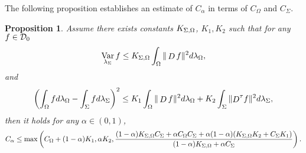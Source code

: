 \documentclass[a4paper]{article}
\newtheorem{proposition}[theorem]{Proposition}
\theoremstyle{definition}
\DeclareMathOperator{\Var}{Var}
\numberwithin{equation}{section}
\begin{document}
The following proposition establishes an estimate of $C_\alpha$ in terms of $C_\Omega$ and $C_\Sigma$. 
\begin{proposition}
\label{prop:interp_method}
Assume  there exists constants $K_{\Sigma,\Omega}$, $K_1, K_2$ such that for any $f \in \mathcal {D}_0$
\begin{align}
\Var_{\lambda_\Sigma} f
\leq  \Cint \int_\Omega \| \Deriv f \|^2 d\lambda_\Omega ,
\label{ineq Cint}
\end{align}
and 
\begin{align}
\left( \int_\Omega f d \lambda_\Omega - \int_\Sigma f d \lambda_\Sigma \right)^2
\leq K_1 \int_\Omega \| \mathop D f \|^2 d\lambda_\Omega + K_2 \int_\Sigma \| {\mathop D}^\tau f \|^2 d\lambda_\Sigma,
\label{ineq K}
\end{align}
then it holds for any  $\alpha \in (0,1)$, 
\begin{align}
C_\alpha \leq
\max \left(
C_\Omega + (1-\alpha)K_1 ,
\alpha K_2 ,
\frac{(1-\alpha)K_{\Sigma,\Omega} C_\Sigma +\alpha C_\Omega C_\Sigma+\alpha(1-\alpha)(K_{\Sigma,\Omega} K_2+C_\Sigma K_1)}{(1-\alpha) K_{\Sigma,\Omega} + \alpha C_\Sigma} \right).
\label{inequality_interpolation}
\end{align}
\end{proposition}
\end{document}
